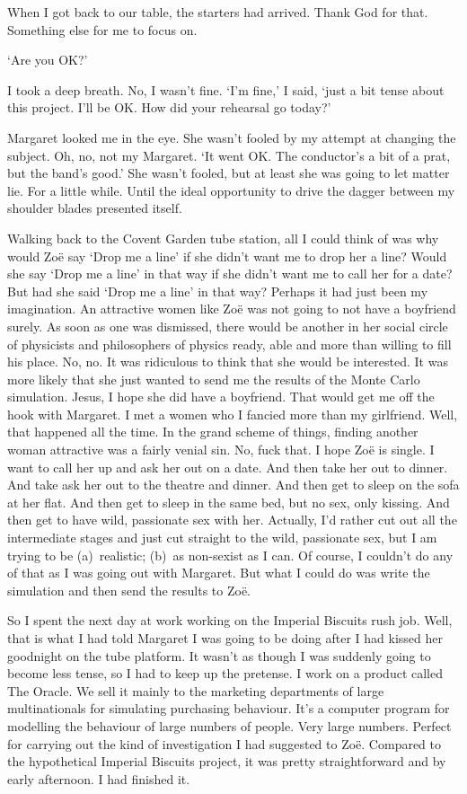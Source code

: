 When I got back to our table, the starters had arrived. Thank God
for that. Something else for me to focus on.

`Are you OK?'

I took a deep breath. No, I wasn't fine. `I'm fine,' I said, `just a bit tense about this project. I'll be
OK. How did your rehearsal go today?'

Margaret looked me in the eye. She wasn't fooled by my attempt at changing the subject. Oh, no, not
{\twelveit my\/} Margaret. `It went OK. The conductor's a bit of a
prat, but the band's good.' She wasn't fooled, but at least she was
going to let matter lie. For a little while. Until the ideal
opportunity to drive the dagger between my shoulder blades presented
itself.

Walking back to the Covent Garden tube station, all I could think of was why would Zoë say `Drop me a line' if she didn't want me to drop her a
line? Would she say `Drop me a line' in that way if she didn't want
me to call her for a date? But had she said `Drop me a line' in that
way? Perhaps it had just been my imagination. An attractive women
like Zoë was not going to not have a boyfriend surely. As soon
as one was dismissed, there would be another in her social circle of
physicists and philosophers of physics ready, able and more than
willing to fill his place. No, no. It was ridiculous to think that
she would be interested. It was more likely that she just wanted to
send me the results of the Monte Carlo simulation. Jesus, I hope she
did have a boyfriend. That would get me off the hook with Margaret.
I met a women who I fancied more than my girlfriend. Well, that
happened all the time. In the grand scheme of things, finding
another woman attractive was a fairly venial sin. No, fuck that. I
hope Zoë is single. I want to call her up and ask her out on a
date. And then take her out to dinner. And take ask her out to the
theatre and dinner. And then get to sleep on the sofa at her flat.
And then get to sleep in the same bed, but no sex, only kissing. And
then get to have wild, passionate sex with her. Actually, I'd rather
cut out all the intermediate stages and just cut straight to the
wild, passionate sex, but I am trying to be (a)~realistic; (b)~as
non-sexist as I can. Of course, I couldn't do any of that as I was
going out with Margaret. But what I could do was write the
simulation and then send the results to Zoë.

So I spent the next day at work working on the Imperial Biscuits rush
job. Well, that is what I had told Margaret I was going to be doing
after I had kissed her goodnight on the tube platform. It wasn't as
though I was suddenly going to become less tense, so I had to keep
up the pretense. I work on a product called The Oracle. We sell it mainly to the
marketing departments of large multinationals for simulating purchasing behaviour. It's a computer program for modelling the
behaviour of large numbers of people. Very large numbers. Perfect for carrying
out the kind of investigation I had suggested to Zoë. Compared to the hypothetical Imperial Biscuits project,
it was pretty straightforward and by early afternoon. I had finished
it.

